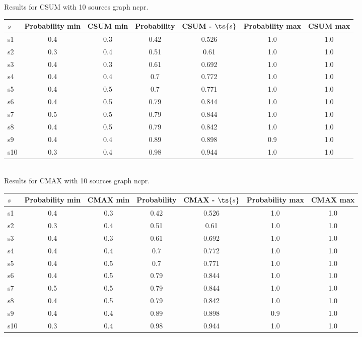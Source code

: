 \documentclass{article}
\begin{document}
\noindent Results for CSUM with 10 sources graph ncpr.

\noindent\begin{tabular}{|l|c|c|c|c|c|c|}
\hline
$s$& Probability min & CSUM min & Probability & CSUM - $\ts{s}$ & Probability max & CSUM max\\
\hline
s1 &0.4 & 0.3 & 0.42 & 0.526 & 1.0 & 1.0\\
\hline
s2 &0.3 & 0.4 & 0.51 & 0.61 & 1.0 & 1.0\\
\hline
s3 &0.4 & 0.3 & 0.61 & 0.692 & 1.0 & 1.0\\
\hline
s4 &0.4 & 0.4 & 0.7 & 0.772 & 1.0 & 1.0\\
\hline
s5 &0.4 & 0.5 & 0.7 & 0.771 & 1.0 & 1.0\\
\hline
s6 &0.4 & 0.5 & 0.79 & 0.844 & 1.0 & 1.0\\
\hline
s7 &0.5 & 0.5 & 0.79 & 0.844 & 1.0 & 1.0\\
\hline
s8 &0.4 & 0.5 & 0.79 & 0.842 & 1.0 & 1.0\\
\hline
s9 &0.4 & 0.4 & 0.89 & 0.898 & 0.9 & 1.0\\
\hline
s10 &0.3 & 0.4 & 0.98 & 0.944 & 1.0 & 1.0\\
\hline
\end{tabular}\\

\noindent Results for CMAX with 10 sources graph ncpr.

\noindent\begin{tabular}{|l|c|c|c|c|c|c|}
\hline
$s$& Probability min & CMAX min & Probability & CMAX - $\ts{s}$ & Probability max & CMAX max\\
\hline
s1 &0.4 & 0.3 & 0.42 & 0.526 & 1.0 & 1.0\\
\hline
s2 &0.3 & 0.4 & 0.51 & 0.61 & 1.0 & 1.0\\
\hline
s3 &0.4 & 0.3 & 0.61 & 0.692 & 1.0 & 1.0\\
\hline
s4 &0.4 & 0.4 & 0.7 & 0.772 & 1.0 & 1.0\\
\hline
s5 &0.4 & 0.5 & 0.7 & 0.771 & 1.0 & 1.0\\
\hline
s6 &0.4 & 0.5 & 0.79 & 0.844 & 1.0 & 1.0\\
\hline
s7 &0.5 & 0.5 & 0.79 & 0.844 & 1.0 & 1.0\\
\hline
s8 &0.4 & 0.5 & 0.79 & 0.842 & 1.0 & 1.0\\
\hline
s9 &0.4 & 0.4 & 0.89 & 0.898 & 0.9 & 1.0\\
\hline
s10 &0.3 & 0.4 & 0.98 & 0.944 & 1.0 & 1.0\\
\hline
\end{tabular}\\
\end{document}
